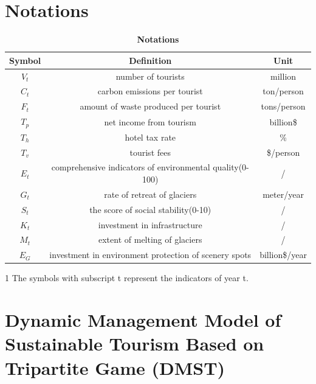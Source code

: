 \documentclass{mcmthesis}
\begin{document}
\section{Notations}
\begin{table}[H]
  \caption{\textbf{Notations}}
  \centering
  \begin{threeparttable}
    \begin{tabular}{ccc}
      \toprule
        Symbol\tnote{1} & Definition & Unit \\
      \midrule
        $V_t$ & number of tourists & million \\ 
        $C_t$ & carbon emissions per tourist & ton/person \\
        $F_t$ & amount of waste produced per tourist & tons/person \\

        $T_p$ & net income from tourism & billion\$ \\
        $T_h$ & hotel tax rate & \% \\
        $T_v$ & tourist fees & \$/person \\

        $E_t$ & comprehensive indicators of environmental quality(0-100) & / \\
        $G_t$ & rate of retreat of glaciers & meter/year \\

        $S_t$ & the score of social stability(0-10) & / \\ 
        $K_t$ & investment in infrastructure & / \\

        $M_t$ & extent of melting of glaciers & / \\
        $E_G$ & investment in environment protection of scenery spots & billion\$/year \\
        \bottomrule
    \end{tabular}
    \begin{tablenotes}
    \footnotesize
      \item[1] The symbols with subscript t represent the indicators of year t.
    \end{tablenotes}
  \end{threeparttable}
\end{table}

\section{Dynamic Management Model of Sustainable Tourism Based on Tripartite Game (DMST)}
\end{document}
